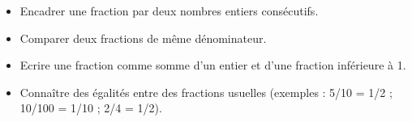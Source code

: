 \begin{prerequis}    
    \begin{itemize}
        \item[\emoji{red-heart}] Encadrer une fraction par deux nombres entiers consécutifs.
        \item[\emoji{red-heart}] Comparer deux fractions de même dénominateur.
        \columnbreak
        \item[\emoji{red-heart}] Ecrire une fraction comme somme d’un entier et d’une fraction inférieure à 1.
        \item[\emoji{diamond-suit}] Connaître des égalités entre des fractions usuelles (exemples : 5/10 = 1/2 ; 10/100 = 1/10 ; 2/4 = 1/2).        
    \end{itemize}
\end{prerequis}